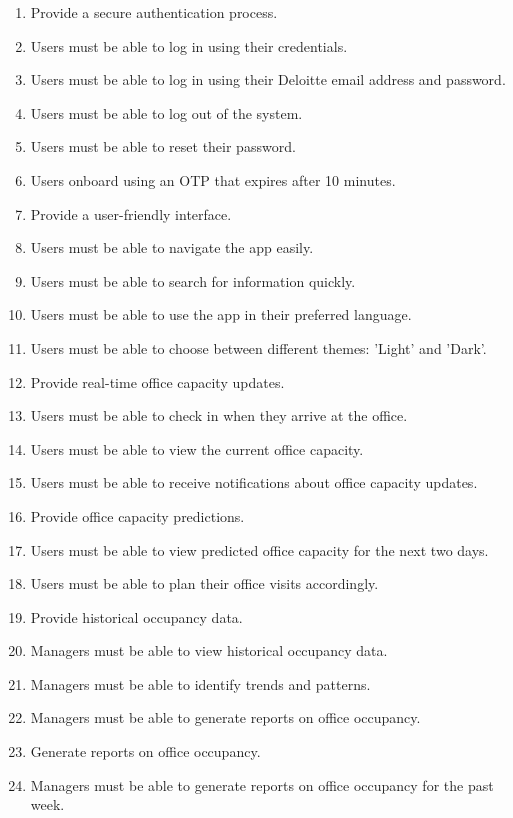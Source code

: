 \documentclass[11pt,a4paper]{article}
\begin{document}
\begin{enumerate}[label=\arabic*.]
    \item Provide a secure authentication process.
    \item Users must be able to log in using their credentials.
    \item Users must be able to log in using their Deloitte email address and password.
    \item Users must be able to log out of the system.
    \item Users must be able to reset their password.
    \item Users onboard using an OTP that expires after 10 minutes.
    \item Provide a user-friendly interface.
    \item Users must be able to navigate the app easily.
    \item Users must be able to search for information quickly.
    \item Users must be able to use the app in their preferred language.
    \item Users must be able to choose between different themes: 'Light' and 'Dark'.
    \item Provide real-time office capacity updates.
    \item Users must be able to check in when they arrive at the office.
    \item Users must be able to view the current office capacity.
    \item Users must be able to receive notifications about office capacity updates.
    \item Provide office capacity predictions.
    \item Users must be able to view predicted office capacity for the next two days.
    \item Users must be able to plan their office visits accordingly.
    \item Provide historical occupancy data.
    \item Managers must be able to view historical occupancy data.
    \item Managers must be able to identify trends and patterns.
    \item Managers must be able to generate reports on office occupancy.
    \item Generate reports on office occupancy.
    \item Managers must be able to generate reports on office occupancy for the past week.

\end{enumerate}
\end{document}
